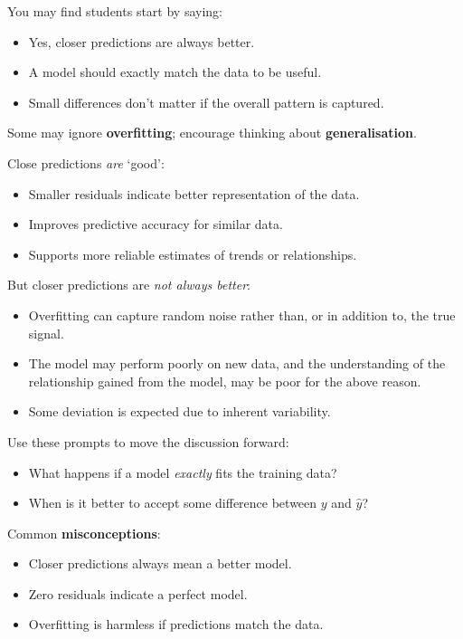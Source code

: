 \documentclass[
  11pt,
  a4paper,
  krantz2]{krantz}
\providecommand{\tightlist}{%
  \setlength{\itemsep}{0pt}\setlength{\parskip}{0pt}}
\begin{document}
You may find students start by saying:

\begin{itemize}
\tightlist
\item
  Yes, closer predictions are always better.
\item
  A model should exactly match the data to be useful.
\item
  Small differences don't matter if the overall pattern is captured.
\end{itemize}

Some may ignore \textbf{overfitting}; encourage thinking about \textbf{generalisation}.

Close predictions \emph{are} `good':

\begin{itemize}
\tightlist
\item
  Smaller residuals indicate better representation of the data.
\item
  Improves predictive accuracy for similar data.
\item
  Supports more reliable estimates of trends or relationships.
\end{itemize}

But closer predictions are \emph{not always better}:

\begin{itemize}
\tightlist
\item
  Overfitting can capture random noise rather than, or in addition to, the true signal.
\item
  The model may perform poorly on new data, and the understanding of the relationship gained from the model, may be poor for the above reason.
\item
  Some deviation is expected due to inherent variability.
\end{itemize}

Use these prompts to move the discussion forward:

\begin{itemize}
\tightlist
\item
  What happens if a model \emph{exactly} fits the training data?
\item
  When is it better to accept some difference between \(y\) and \(\hat{y}\)?
\end{itemize}

Common \textbf{misconceptions}:

\begin{itemize}
\tightlist
\item
  Closer predictions always mean a better model.
\item
  Zero residuals indicate a perfect model.
\item
  Overfitting is harmless if predictions match the data.
\end{itemize}
\end{document}
